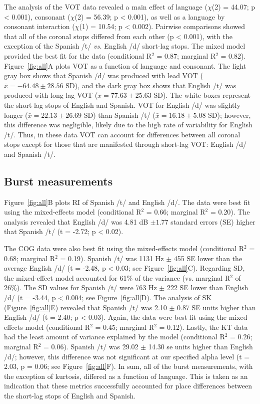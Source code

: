 \documentclass[a4paper,11pt,twocolumn]{article}
\begin{document}
The analysis of the VOT data revealed a main effect of language ($\chi$(2) = 44.07; p < 0.001), consonant ($\chi$(2) = 56.39; p < 0.001), as well as a language by consonant interaction ($\chi$(1) = 10.54; p < 0.002). Pairwise comparisons showed that all of the coronal stops differed from each other (p < 0.001), with the exception of the Spanish /t/ \textit{vs.} English /d/ short-lag stops. The mixed model provided the best fit for the data (conditional R$^2$ = 0.87; marginal R$^2$ = 0.82). Figure~\ref{fig:all}A plots VOT as a function of language and consonant. The light gray box shows that Spanish /d/ was produced with lead VOT ($\bar{x} = -64.48 \pm 28.56$ SD), and the dark gray box shows that English /t/ was produced with long-lag VOT ($\bar{x} = 77.63 \pm 25.63$ SD). The white boxes represent the short-lag stops of English and Spanish. VOT for English /d/ was slightly longer ($\bar{x} = 22.13 \pm 26.69$ SD) than Spanish /t/ ($\bar{x} = 16.18 \pm 5.08$ SD); however, this difference was negligible, likely due to the high rate of variability for English /t/. Thus, in these data VOT can account for differences between all coronal stops except for those that are manifested through short-lag VOT: English /d/ and Spanish /t/.

\subsection{Burst measurements}

Figure~\ref{fig:all}B plots RI of Spanish /t/ and English /d/. The data were best fit using the mixed-effects model (conditional R$^2$ = 0.66; marginal R$^2$ = 0.20). The analysis revealed that English /d/ was 4.81 dB $\pm 1.77$ standard errors (SE) higher that Spanish /t/ (t = -2.72; p < 0.02).

The COG data were also best fit using the mixed-effects model (conditional R$^2$ = 0.68; marginal R$^2$ = 0.19). Spanish /t/ was 1131 Hz $\pm$ 455 SE lower than the average English /d/ (t = -2.48, p < 0.03; see Figure~\ref{fig:all}C). Regarding SD, the mixed-effect model accounted for 61\% of the variance (vs. marginal R$^2$ of 26\%). The SD values for Spanish /t/ were 763 Hz $\pm$ 222 SE lower than English /d/ (t = -3.44, p < 0.004; see Figure~\ref{fig:all}D). The analysis of SK (Figure~\ref{fig:all}E) revealed that Spanish /t/ was 2.10 $\pm$ 0.87 SE units higher than English /d/ (t = 2.40; p < 0.03). Again, the data were best fit using the mixed effects model (conditional R$^2$ = 0.45; marginal R$^2$ = 0.12). Lastly, the KT data had the least amount of variance explained by the model (conditional R$^2$ = 0.26; marginal R$^2$ = 0.06). Spanish /t/ was 29.02 $\pm$ 14.30 se units higher than English /d/; however, this difference was not significant at our specified alpha level (t = 2.03, p = 0.06; see Figure~\ref{fig:all}F). In sum, all of the burst measurements, with the exception of kurtosis, differed as a function of language. This is taken as an indication that these metrics successfully accounted for place differences between the short-lag stops of English and Spanish.
\end{document}
